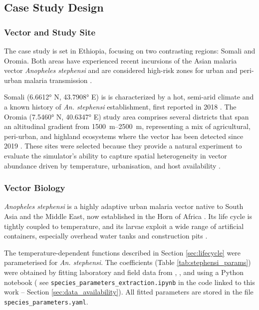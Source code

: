 \documentclass{article}
\begin{document}
\subsection{Case Study Design}
\label{sec:case_study}
\subsubsection{Vector and Study Site}
\par
The case study is set in Ethiopia, focusing on two contrasting regions: Somali and Oromia. 
Both areas have experienced recent incursions of the Asian malaria vector \textit{Anopheles stephensi} and are 
considered high-risk zones for urban and peri-urban malaria transmission \citep{2020.MB.GDO, 2021.MB.AUO, 2023.DH.FRO}.
\par
Somali (\ang{6.6612} N, \ang{43.7908} E) is is characterized by a hot, semi-arid climate and a known 
history of \textit{An. stephensi} establishment, first reported in 2018 \citep{2020.MB.GDO}. The Oromia (\ang{7.5460} N, \ang{40.6347} E) 
study area comprises several districts that span an altitudinal gradient from \SIrange{1500}{2500}{\meter}, representing a mix of 
agricultural, peri-urban, and highland ecosystems where the vector has been detected since 2019 \citep{2021.MB.AUO, 2024.TA.SDA}. 
These sites were selected because they provide a natural experiment to evaluate the simulator's 
ability to capture spatial heterogeneity in vector abundance driven by temperature, urbanisation, and host availability 
\citep{2025.TD.BOA, 2024.GZ.ROC}.

\subsubsection{Vector Biology}
\label{sec:stephensi_lifecycle}

\textit{Anopheles stephensi} is a highly adaptive urban malaria vector native to South Asia and the Middle East, now established 
in the Horn of Africa \citep{2024.RT.IAS}. Its life cycle is tightly coupled to temperature, and its larvae exploit a wide range 
of artificial containers, especially overhead water tanks and construction pits \citep{2016.ST.OTI}. 

The temperature-dependent functions described in Section \ref{sec:lifecycle} were parameterised for \textit{An. stephensi}. 
The coefficients (Table \ref{tab:stephensi_params}) were obtained by fitting laboratory and field data from 
\citet{2023.NT.EOT}, \citet{2022.OC.TIT}, and \citet{1980.WK.HLT} using a Python notebook ( see 
\texttt{species\_parameters\_extraction.ipynb} in the code linked to this work -- Section \ref{sec:data_availability}). 
All fitted parameters are stored in the file \texttt{species\_parameters.yaml}.
\end{document}

